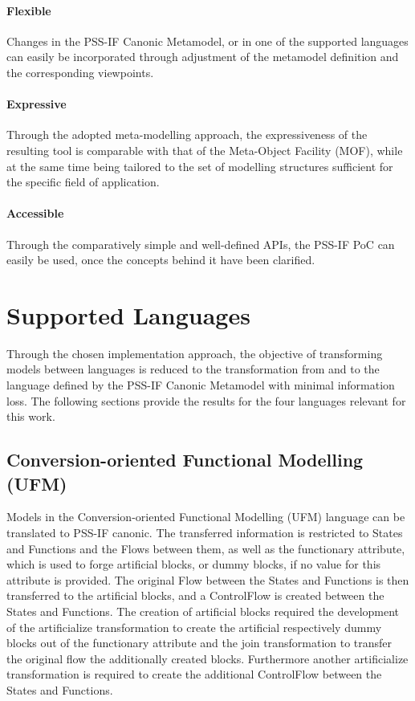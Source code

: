 \paragraph{Flexible} Changes in the PSS-IF Canonic Metamodel, or in one of the supported languages can easily be incorporated through adjustment of the metamodel definition and the corresponding viewpoints.

\paragraph{Expressive} Through the adopted meta-modelling approach, the expressiveness of the resulting tool is comparable with that of the Meta-Object Facility (MOF), while at the same time being tailored to the set of modelling structures sufficient for the specific field of application.

\paragraph{Accessible} Through the comparatively simple and well-defined APIs, the PSS-IF PoC can easily be used, once the concepts behind it have been clarified.

\section{Supported Languages}
\label{sec:results:languages}

Through the chosen implementation approach, the objective of transforming models between languages is reduced to the transformation from and to the language defined by the PSS-IF Canonic Metamodel with minimal information loss. The following sections provide the results for the four languages relevant for this work.

\subsection{Conversion-oriented Functional Modelling (UFM)}

Models in the Conversion-oriented Functional Modelling (UFM) language can be translated to PSS-IF canonic. The transferred information is restricted to States and Functions and the Flows between them, as well as the functionary attribute, which is used to forge artificial blocks, or dummy blocks, if no value for this attribute is provided. The original Flow between the States and Functions is then transferred to the artificial blocks, and a ControlFlow is created between the States and Functions. The creation of artificial blocks required the development of the artificialize transformation to create the artificial respectively dummy blocks out of the functionary attribute and the join transformation to transfer the original flow the additionally created blocks. Furthermore another artificialize transformation is required to create the additional ControlFlow between the States and Functions.

